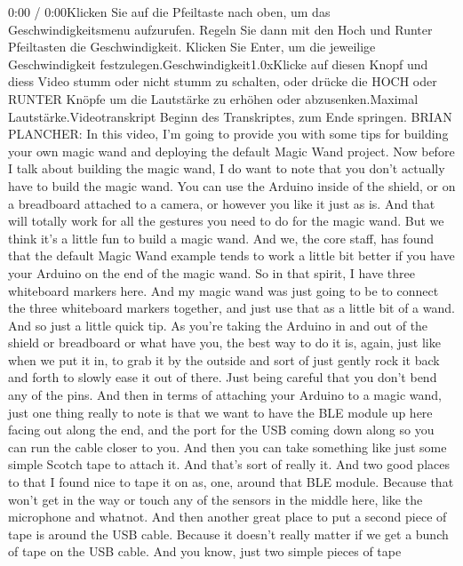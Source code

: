     0:00 / 0:00Klicken Sie auf die Pfeiltaste nach oben, um das Geschwindigkeitsmenu aufzurufen. Regeln Sie dann mit den Hoch und Runter Pfeiltasten die Geschwindigkeit. Klicken Sie Enter, um die jeweilige Geschwindigkeit festzulegen.Geschwindigkeit1.0xKlicke auf diesen Knopf und diess Video stumm oder nicht stumm zu schalten, oder drücke die HOCH oder RUNTER Knöpfe um die Lautstärke zu erhöhen oder abzusenken.Maximal Lautstärke.Videotranskript
    Beginn des Transkriptes, zum Ende springen.
    BRIAN PLANCHER: In this video, I'm going to provide you with some tips
    for building your own magic wand and deploying the default Magic Wand
    project.
    Now before I talk about building the magic wand,
    I do want to note that you don't actually have to build the magic wand.
    You can use the Arduino inside of the shield,
    or on a breadboard attached to a camera, or however you like it just as is.
    And that will totally work for all the gestures
    you need to do for the magic wand.
    But we think it's a little fun to build a magic wand.
    And we, the core staff, has found that the default Magic Wand
    example tends to work a little bit better
    if you have your Arduino on the end of the magic wand.
    So in that spirit, I have three whiteboard markers here.
    And my magic wand was just going to be to connect the three
    whiteboard markers together, and just use that as a little bit of a wand.
    And so just a little quick tip.
    As you're taking the Arduino in and out of the shield or breadboard or what
    have you, the best way to do it is, again, just like when we put it in,
    to grab it by the outside and sort of just
    gently rock it back and forth to slowly ease it out of there.
    Just being careful that you don't bend any of the pins.
    And then in terms of attaching your Arduino to a magic wand,
    just one thing really to note is that we want
    to have the BLE module up here facing out along the end,
    and the port for the USB coming down along
    so you can run the cable closer to you.
    And then you can take something like just some simple Scotch tape
    to attach it.
    And that's sort of really it.
    And two good places to that I found nice to
    tape it on as, one, around that BLE module.
    Because that won't get in the way or touch any of the sensors in the middle
    here, like the microphone and whatnot.
    And then another great place to put a second piece of tape
    is around the USB cable.
    Because it doesn't really matter if we get a bunch of tape on the USB cable.
    And you know, just two simple pieces of tape
